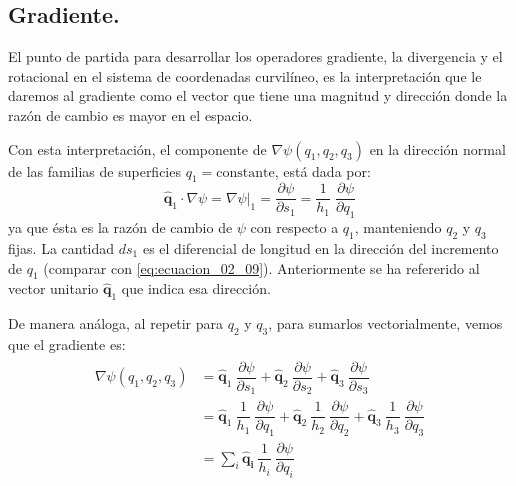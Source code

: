 \subsection{Gradiente.} 
El punto de partida para desarrollar los operadores gradiente, la divergencia y el rotacional en el sistema de coordenadas curvilíneo, es la interpretación que le daremos al gradiente como el vector que tiene una magnitud y dirección donde la razón de cambio es mayor en el espacio.
\par
Con esta interpretación, el componente de $\nabla \psi(q_{1}, q_{2}, q_{3})$ en la dirección normal de las familias de superficies $q_{1} = \text{constante}$, está dada por:
\begin{equation}
\mathbf{\widehat{q}}_{1} \cdot \nabla \psi = \nabla \psi \big\vert_{1} = \dfrac{\partial \psi}{\partial s_{1}} = \dfrac{1}{h_{1}} \; \dfrac{\partial \psi}{\partial q_{1}}
\label{eq:ecuacion_02_17}
\end{equation}
ya que ésta es la razón de cambio de $\psi$ con respecto a $q_{1}$, manteniendo $q_{2}$ y $q_{3}$ fijas. La cantidad $ds_{1}$ es el diferencial de longitud en la dirección del incremento de $q_{1}$ (comparar con \ref{eq:ecuacion_02_09}). Anteriormente se ha refererido al vector unitario $\mathbf{\widehat{q}}_{1}$ que indica esa dirección.
\par
De manera análoga, al repetir para $q_{2}$ y $q_{3}$, para sumarlos vectorialmente, vemos que el gradiente es:
\begin{eqnarray}
\begin{aligned}
\nabla \psi (q_{1},q_{2},q_{3}) &= \mathbf{\widehat{q}}_{1} \: \dfrac{\partial \psi}{\partial s_{1}} + \mathbf{\widehat{q}}_{2} \: \dfrac{\partial \psi}{\partial s_{2}} + \mathbf{\widehat{q}}_{3} \: \dfrac{\partial \psi}{\partial s_{3}} \\
&= \mathbf{\widehat{q}}_{1} \: \dfrac{1}{h_{1}} \: \dfrac{\partial \psi}{\partial q_{1}} + \mathbf{\widehat{q}}_{2}\: \dfrac{1}{h_{2}} \: \dfrac{\partial \psi}{\partial q_{2}} + \mathbf{\widehat{q}}_{3} \: \dfrac{1}{h_{3}} \: \dfrac{\partial \psi}{\partial q_{3}} \\
&= \sum_{i} \mathbf{\widehat{q}_{i}} \: \dfrac{1}{h_{i}} \: \dfrac{\partial \psi}{\partial q_{i}}
\label{eq:ecuacion_02_18}
\end{aligned}
\end{eqnarray}
